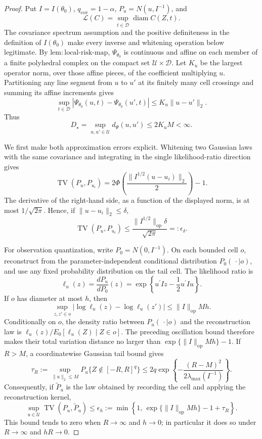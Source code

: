 \documentclass{article}
\begin{document}
\begin{proof}
Put \(I=I(\theta_0)\), \(q_{\mathrm{cov}}=1-\alpha\), \(P_u=N(u,I^{-1})\), and
\[
\mathcal L(C)=\sup_{t\in\mathcal D}\operatorname{diam}C(Z,t).
\]
The covariance spectrum assumption and the positive definiteness in the definition of \(I(\theta_0)\) make every inverse and whitening operation below legitimate.  By \(\mathrm{lem:local\mbox{-}risk\mbox{-}map}\), \(\Psi_{\theta_0}\) is continuous and affine on each member of a finite polyhedral complex on the compact set \(\mathcal U\times\mathcal D\).  Let \(K_u\) be the largest operator norm, over those affine pieces, of the coefficient multiplying \(u\).  Partitioning any line segment from \(u\) to \(u'\) at its finitely many cell crossings and summing its affine increments gives
\[
\sup_{t\in\mathcal D}
\left|\Psi_{\theta_0}(u,t)-\Psi_{\theta_0}(u',t)\right|
\le K_u\lVert u-u'\rVert_2.
\]
Thus
\[
D_\star=\sup_{u,u'\in\mathcal U}d_\Psi(u,u')
\le 2K_uM<\infty.
\]

We first make both approximation errors explicit.  Whitening two Gaussian laws with the same covariance and integrating in the single likelihood-ratio direction gives
\[
\operatorname{TV}(P_u,P_{u_i})
=2\Phi\!\left(\frac{\lVert I^{1/2}(u-u_i)\rVert_2}{2}\right)-1.
\]
The derivative of the right-hand side, as a function of the displayed norm, is at most \(1/\sqrt{2\pi}\).  Hence, if \(\lVert u-u_i\rVert_2\le\delta\),
\[
\operatorname{TV}(P_u,P_{u_i})
\le \frac{\lVert I^{1/2}\rVert_{\mathrm{op}}\delta}{\sqrt{2\pi}}
=:\epsilon_\delta.
\]

For observation quantization, write \(P_0=N(0,I^{-1})\).  On each bounded cell \(o\), reconstruct from the parameter-independent conditional distribution \(P_0(\,\cdot\mid o)\), and use any fixed probability distribution on the tail cell.  The likelihood ratio is
\[
\ell_u(z)=\frac{dP_u}{dP_0}(z)
=\exp\!\left\{u^{\prime}Iz-\frac12u^{\prime}Iu\right\}.
\]
If \(o\) has diameter at most \(h\), then
\[
\sup_{z,z'\in o}
\left|\log\ell_u(z)-\log\ell_u(z')\right|
\le \lVert I\rVert_{\mathrm{op}}Mh.
\]
Conditionally on \(o\), the density ratio between \(P_u(\,\cdot\mid o)\) and the reconstruction law is \(\ell_u(z)/E_0[\ell_u(Z)\mid Z\in o]\).  The preceding oscillation bound therefore makes their total variation distance no larger than
\(\exp\{\lVert I\rVert_{\mathrm{op}}Mh\}-1\).  If \(R>M\), a coordinatewise Gaussian tail bound gives
\[
\tau_R:=\sup_{\lVert u\rVert_2\le M}
P_u\{Z\notin[-R,R]^q\}
\le 2q\exp\!\left\{
-\frac{(R-M)^2}{2\lambda_{\max}(I^{-1})}
\right\}.
\]
Consequently, if \(\widetilde P_u\) is the law obtained by recording the cell and applying the reconstruction kernel,
\[
\sup_{u\in\mathcal U}\operatorname{TV}(P_u,\widetilde P_u)
\le
\epsilon_h:=
\min\!\left\{1,\,
\exp\{\lVert I\rVert_{\mathrm{op}}Mh\}-1+\tau_R
\right\}.
\]
This bound tends to zero when \(R\to\infty\) and \(h\to0\); in particular it does so under \(R\to\infty\) and \(hR\to0\).


\end{proof}
\end{document}
